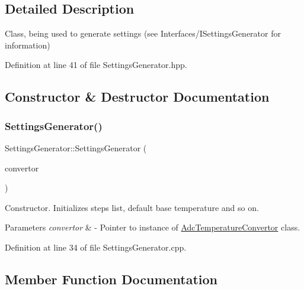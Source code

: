 \subsection{Detailed Description}
Class, being used to generate settings (see Interfaces/\+I\+Settings\+Generator for information) 

Definition at line 41 of file Settings\+Generator.\+hpp.



\subsection{Constructor \& Destructor Documentation}
\mbox{\label{class_settings_generator_a063e189547011b62a567ff55446341d7}} 
\subsubsection{\texorpdfstring{Settings\+Generator()}{SettingsGenerator()}}
{\footnotesize\ttfamily Settings\+Generator\+::\+Settings\+Generator (\begin{DoxyParamCaption}\item[{\hyperlink{class_interfaces_1_1_i_adc_temperature_convertor}{Interfaces\+::\+I\+Adc\+Temperature\+Convertor} $\ast$}]{convertor }\end{DoxyParamCaption})}



Constructor. Initializes steps list, default base temperature and so on. 


\begin{DoxyParams}{Parameters}
{\em convertor} & -\/ Pointer to instance of \hyperlink{class_adc_temperature_convertor}{Adc\+Temperature\+Convertor} class. \\
\hline
\end{DoxyParams}


Definition at line 34 of file Settings\+Generator.\+cpp.



\subsection{Member Function Documentation}
\mbox{\label{class_settings_generator_a99bbe6e67e638ccc7bf6b21b3bc36135}} 
